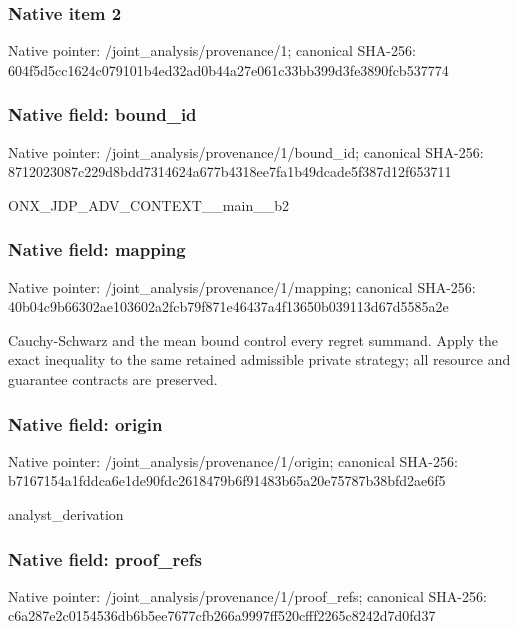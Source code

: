 \documentclass[10pt,a4paper]{article}
\begin{document}
\subsubsection{Native item 2}
Native pointer: /joint\_\allowbreak{}analysis/provenance/1; canonical SHA-256: 604f5d5cc1624c079101b4ed32ad0b44a27e061c33bb399d3fe3890fcb537774

\subsubsection{Native field: bound\_\allowbreak{}id}
Native pointer: /joint\_\allowbreak{}analysis/provenance/1/bound\_\allowbreak{}id; canonical SHA-256: 8712023087c229d8bdd7314624a677b4318ee7fa1b49dcade5f387d12f653711

\begingroup\raggedright\sloppy ONX\_\allowbreak{}JDP\_\allowbreak{}ADV\_\allowbreak{}CONTEXT\_\allowbreak{}\_\allowbreak{}main\_\allowbreak{}\_\allowbreak{}b2\par\endgroup

\subsubsection{Native field: mapping}
Native pointer: /joint\_\allowbreak{}analysis/provenance/1/mapping; canonical SHA-256: 40b04c9b66302ae103602a2fcb79f871e46437a4f13650b039113d67d5585a2e

\begingroup\raggedright\sloppy Cauchy-Schwarz and the mean bound control every regret summand. Apply the exact inequality to the same retained admissible private strategy;\allowbreak{} all resource and guarantee contracts are preserved.\par\endgroup

\subsubsection{Native field: origin}
Native pointer: /joint\_\allowbreak{}analysis/provenance/1/origin; canonical SHA-256: b7167154a1fddca6e1de90fdc2618479b6f91483b65a20e75787b38bfd2ae6f5

\begingroup\raggedright\sloppy analyst\_\allowbreak{}derivation\par\endgroup

\subsubsection{Native field: proof\_\allowbreak{}refs}
Native pointer: /joint\_\allowbreak{}analysis/provenance/1/proof\_\allowbreak{}refs; canonical SHA-256: c6a287e2c0154536db6b5ee7677cfb266a9997ff520cfff2265c8242d7d0fd37
\end{document}
